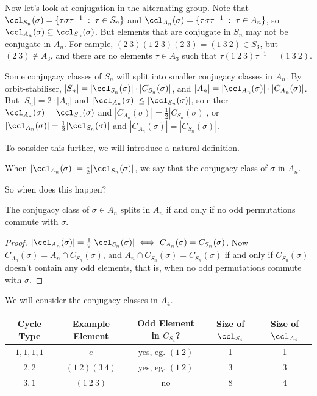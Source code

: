 \documentclass[a4paper]{scrartcl}
\begin{document}
Now let's look at conjugation in the alternating group. Note that $\ccl_{S_n}(\sigma) = \{\tau \sigma \tau^{-1} \; : \; \tau \in S_n\}$ and $\ccl_{A_n}(\sigma) = \{\tau \sigma \tau^{-1} \; : \; \tau \in A_n\}$, so $\ccl_{A_n}(\sigma) \subseteq \ccl_{S_n}(\sigma)$. But elements that are conjugate in $S_n$ may not be conjugate in $A_n$. For eample, $(2\ 3)(1\ 2\ 3)(2\ 3) = (1\ 3\ 2) \in S_3$, but $(2\ 3) \not\in A_3$, and there are no elements $\tau \in A_3$ such that $\tau (1\ 2\ 3)\tau^{-1} = (1\ 3\ 2)$. 

Some conjugacy classes of $S_n$ will split into smaller conjugacy classes in $A_n$. By orbit-stabiliser, $|S_n| = |\ccl_{S_n}(\sigma)| \cdot |C_{S_n}(\sigma)|$, and $|A_n| = |\ccl_{A_n}(\sigma)| \cdot |C_{A_n}(\sigma)|$. But $|S_n| = 2 \cdot |A_n|$ and $|\ccl_{A_n}(\sigma)| \leq |\ccl_{S_n}(\sigma)|$, so either $\ccl_{A_n}(\sigma) = \ccl_{S_n}(\sigma)$ and $|C_{A_n}(\sigma)| = \frac{1}{2}|C_{S_n}(\sigma)|$, or $|\ccl_{A_n}(\sigma)| = \frac{1}{2}|\ccl_{S_n}(\sigma)|$ and $|C_{A_n}(\sigma)| = |C_{S_n}(\sigma)|$.

To consider this further, we will introduce a natural definition.

\begin{definition}
When $|\ccl_{A_n}(\sigma)| = \frac{1}{2}|\ccl_{S_n}(\sigma)|$, we say that the conjugacy class of $\sigma$  in $A_n$.
\end{definition}

So when does this happen?

\begin{proposition}
	The conjugacy class of $\sigma \in A_n$ splits in $A_n$ if and only if no odd permutations commute with $\sigma$.
\end{proposition}
\begin{proof}
	$|\ccl_{A_n}(\sigma)| = \frac{1}{2}|\ccl_{S_n}(\sigma)| \iff C_{A_n}(\sigma) = C_{S_n}(\sigma)$. Now $C_{A_n}(\sigma) = A_n \cap C_{S_n}(\sigma)$, and $A_n \cap C_{S_n}(\sigma) = C_{S_n}(\sigma)$ if and only if $C_{S_n}(\sigma)$ doesn't contain any odd elements, that is, when no odd permutations commute with $\sigma$.
\end{proof}

\begin{example}
	We will consider the conjugacy classes in $A_4$. 
	\begin{center}
		\begin{tabular}{@{}ccccc@{}}
		\toprule
		Cycle Type & Example Element &Odd Element in $C_{S_4}$? & Size of $\ccl_{S_4}$ & Size of $\ccl_{A_4}$ \\ \midrule
		$1, 1, 1, 1$ & $e$ & yes, eg. $(1\ 2)$ & 1 & 1 \\
		$2, 2$ & $(1\ 2)(3\ 4)$ & yes, eg. $(1\ 2)$ & 3 & 3\\
		$3, 1$ & $(1\ 2\ 3)$ & no & 8 & 4\\
		\bottomrule
		\end{tabular}
	\end{center}
\end{example}
\end{document}
